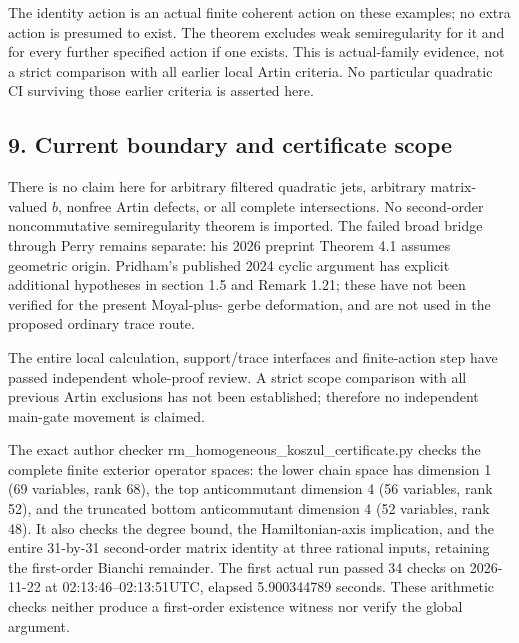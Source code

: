 The identity action is an actual finite coherent action on these
examples; no extra action is presumed to exist. The theorem
excludes weak semiregularity for it and for every further specified
action if one exists. This is actual-family evidence, not a strict
comparison with all earlier local Artin criteria. No particular
quadratic CI surviving those earlier criteria is asserted here.

\subsection{9. Current boundary and certificate scope}\label{SF-E846:s9}

There is no claim here for arbitrary filtered quadratic jets, arbitrary
matrix-valued \(b\), nonfree Artin defects, or all complete intersections.
No second-order noncommutative semiregularity theorem is imported.
The failed broad bridge through Perry remains separate: his 2026
preprint Theorem 4.1 assumes geometric origin. Pridham's published
2024 cyclic argument has explicit additional hypotheses in section 1.5
and Remark 1.21; these have not been verified for the present Moyal-plus-
gerbe deformation, and are not used in the proposed ordinary trace route.

The entire local calculation, support/trace interfaces and finite-action
step have passed independent whole-proof review. A strict scope comparison
with all previous Artin exclusions has not been established; therefore no
independent main-gate movement is claimed.

The exact author checker rm\_homogeneous\_koszul\_certificate.py
checks the complete finite exterior operator spaces: the lower
chain space has dimension 1 (69 variables, rank 68), the top
anticommutant dimension 4 (56 variables, rank 52), and the truncated
bottom anticommutant dimension 4 (52 variables, rank 48). It also
checks the degree bound, the Hamiltonian-axis implication, and
the entire 31-by-31 second-order matrix identity at three rational
inputs, retaining the first-order Bianchi remainder. The first
actual run passed 34 checks on 2026-11-22 at 02:13:46--02:13:51UTC,
elapsed 5.900344789 seconds. These arithmetic checks neither produce
a first-order existence witness nor verify the global argument.
